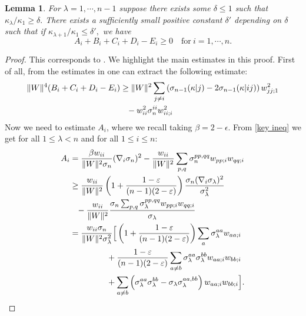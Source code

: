 \documentclass{amsart}
\newtheorem{lemma}[theorem]{Lemma}
\theoremstyle{definition}
\theoremstyle{remark}
\numberwithin{equation}{section}
\begin{document}
\begin{lemma}\label{app3}
For $\lambda=1,\cdots,n-1$ suppose there exists some $\delta\leq 1$ such that $\kappa_{\lambda}/\kappa_1\geq \delta.$ There exists a sufficiently small positive constant $\delta'$ depending on $\delta$ such that if $\kappa_{\lambda+1}/\kappa_1\leq \delta',$ we have
\[A_i+B_i+C_i+D_i-E_i\geq 0\quad \text{for}~i=1,\cdots,n.\]
\end{lemma}
\begin{proof}
This corresponds to \cite[Lemma~4.3]{Guan}. We highlight the main estimates in this proof. First of all, from the estimates in \cite[Lemma~4.2]{Guan} one can extract the following estimate:
\begin{align}\begin{split}\label{app3-1}
\|W\|^4(B_i+C_i+D_i-E_i)&\geq \|W\|^2\sum_{j\neq i} \left(\sigma_{n-1}(\kappa|j)-2\sigma_{n-1}(\kappa|ij)\right)w_{jj;1}^2\\
				&\hphantom{=}-w_{ii}^2\sigma_{n}^{ii}w_{ii;i}^2 
\end{split}\end{align}
Now we need to estimate $A_i$, where we recall taking $\beta=2-\epsilon$. From \eqref{key ineq} we get for all $1\leq \lambda<n$ and for all $1\leq i\leq n\colon$
\begin{align}\begin{split}
A_i&=\frac{\beta w_{ii}}{\|W\|^2\sigma_n}(\nabla_i\sigma_n)^2-\frac{w_{ii}}{\|W\|^2}\sum_{p,q}\sigma_n^{pp,qq}w_{pp;i}w_{qq;i}\\
		&\geq \frac{w_{ii}}{\|W\|^2}\left(1+\frac{1-\varepsilon}{(n-1)(2-\varepsilon)}\right)\frac{\sigma_n(\nabla_i\sigma_{\lambda})^2}{\sigma_{\lambda}^2}\\
					&\hphantom{=}-\frac{w_{ii}}{\|W\|^2}\frac{\sigma_n\sum_{p,q}\sigma_{\lambda}^{pp,qq}w_{pp;i}w_{qq;i}}{\sigma_{\lambda}}\\
                    &=\frac{w_{ii}\sigma_n}{\|W\|^2\sigma_{\lambda}^2}\Big[\left(1+\frac{1-\varepsilon}{(n-1)(2-\varepsilon)}\right)\sum_{a}\sigma_{\lambda}^{aa}w_{aa;i}\\
                    	&\hphantom{\frac{w_{ii}\sigma_n}{\|W\|^2\sigma_{\lambda}^2}\Big(}+\frac{1-\varepsilon}{(n-1)(2-\varepsilon)}\sum_{a\neq b}\sigma_\lambda^{aa}\sigma_{\lambda}^{bb}w_{aa;i}w_{bb;i}\\
                        &\hphantom{\frac{w_{ii}\sigma_n}{\|W\|^2\sigma_{\lambda}^2}\Big(}+\sum_{a\neq b}\left(\sigma_{\lambda}^{aa}\sigma_{\lambda}^{bb}-\sigma_{\lambda}\sigma_{\lambda}^{aa,bb}\right)w_{aa;i}w_{bb;i}\Big].
\end{split}\end{align}


\end{proof}
\end{document}
